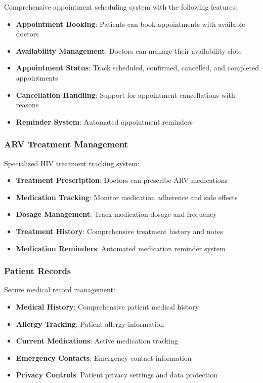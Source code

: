 \documentclass[12pt,a4paper]{article}
\begin{document}
Comprehensive appointment scheduling system with the following features:

\begin{itemize}
    \item \textbf{Appointment Booking}: Patients can book appointments with available doctors
    \item \textbf{Availability Management}: Doctors can manage their availability slots
    \item \textbf{Appointment Status}: Track scheduled, confirmed, cancelled, and completed appointments
    \item \textbf{Cancellation Handling}: Support for appointment cancellations with reasons
    \item \textbf{Reminder System}: Automated appointment reminders
\end{itemize}

\subsubsection{ARV Treatment Management}

Specialized HIV treatment tracking system:

\begin{itemize}
    \item \textbf{Treatment Prescription}: Doctors can prescribe ARV medications
    \item \textbf{Medication Tracking}: Monitor medication adherence and side effects
    \item \textbf{Dosage Management}: Track medication dosage and frequency
    \item \textbf{Treatment History}: Comprehensive treatment history and notes
    \item \textbf{Medication Reminders}: Automated medication reminder system
\end{itemize}

\subsubsection{Patient Records}

Secure medical record management:

\begin{itemize}
    \item \textbf{Medical History}: Comprehensive patient medical history
    \item \textbf{Allergy Tracking}: Patient allergy information
    \item \textbf{Current Medications}: Active medication tracking
    \item \textbf{Emergency Contacts}: Emergency contact information
    \item \textbf{Privacy Controls}: Patient privacy settings and data protection
\end{itemize}
\end{document}

